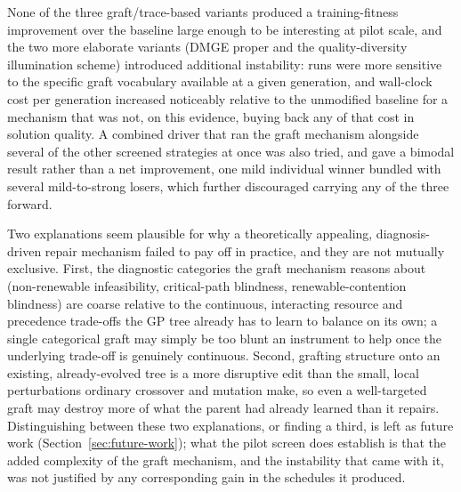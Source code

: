 
 None of the three graft/trace-based
variants produced a training-fitness improvement over the baseline large
enough to be interesting at pilot scale, and the two more elaborate
variants (DMGE proper and the quality-diversity illumination scheme)
introduced additional instability: runs were more sensitive to the specific
graft vocabulary available at a given generation, and wall-clock cost per
generation increased noticeably relative to the unmodified baseline for a
mechanism that was not, on this evidence, buying back any of that cost in
solution quality. A combined driver that ran the graft mechanism alongside
several of the other screened strategies at once was also tried, and gave a
bimodal result rather than a net improvement, one mild individual winner
bundled with several mild-to-strong losers, which further discouraged
carrying any of the three forward.

Two explanations seem plausible for why a theoretically appealing,
diagnosis-driven repair mechanism failed to pay off in practice, and they
are not mutually exclusive. First, the diagnostic categories the graft
mechanism reasons about (non-renewable infeasibility, critical-path
blindness, renewable-contention blindness) are coarse relative to the
continuous, interacting resource and precedence trade-offs the GP tree
already has to learn to balance on its own; a single categorical graft may
simply be too blunt an instrument to help once the underlying trade-off is
genuinely continuous. Second, grafting structure onto an existing,
already-evolved tree is a more disruptive edit than the small, local
perturbations ordinary crossover and mutation make, so even a well-targeted
graft may destroy more of what the parent had already learned than it
repairs. Distinguishing between these two explanations, or finding a third,
is left as future work (Section~\ref{sec:future-work}); what the pilot
screen does establish is that the added complexity of the graft mechanism,
and the instability that came with it, was not justified by any
corresponding gain in the schedules it produced.

